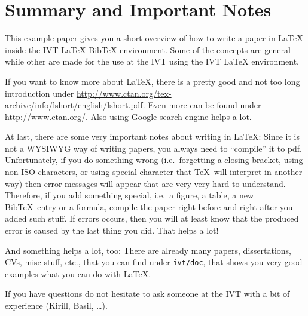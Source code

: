 %
\section{Summary and Important Notes}
%

This example paper gives you a short overview of how to write a paper
in \LaTeX{} inside the IVT \LaTeX{}-Bib\TeX{} environment. 
Some of the
concepts are general while other are made for the use at the IVT using
the IVT \LaTeX{} environment.

If you want to know more about \LaTeX, there is a pretty good and not
too long introduction under
\url{http://www.ctan.org/tex-archive/info/lshort/english/lshort.pdf}.
Even more can be found under \url{http://www.ctan.org/}. Also using
Google search engine helps a lot.

At last, there are some very important notes about writing in \LaTeX:
Since it is not a WYSIWYG way of writing papers, you always need to
``compile'' it to pdf. Unfortunately, if you do something wrong (i.e.\
forgetting a closing bracket, using non ISO characters, or using
special character that \TeX\ will interpret in another way) then error
messages will appear that are very very hard to understand. Therefore,
if you add something special, i.e.\ a figure, a table, a new Bib\TeX\
entry or a formula, compile the paper right before and right after you
added such stuff. If errors occurs, then you will at least know that
the produced error is caused by the last thing you did. That helps a
lot!

And something helps a lot, too: There are already many papers,
dissertations, CVs, misc stuff, etc., that you can find under
\texttt{ivt/doc}, that shows you very good examples what you can do
with \LaTeX.

If you have questions do not hesitate to ask someone at the IVT with a
bit of experience (Kirill, Basil, \ldots).


